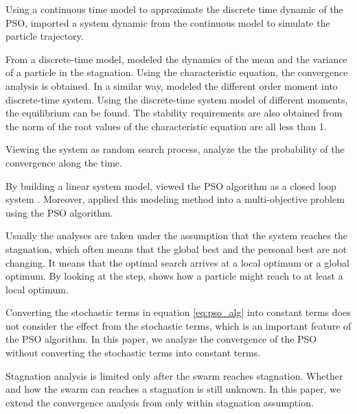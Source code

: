 Using a continuous time model to approximate the discrete time dynamic of the PSO, \cite{5675669} imported a system dynamic from the continuous model to simulate the particle trajectory. 

From a discrete-time model, 
\cite{Jiang20078} 
\cite{jiang2007particle}
modeled the dynamics of the mean and the variance of a particle in the stagnation.
Using the characteristic equation, the convergence analysis is obtained.
In a similar way, 
\cite{5175367}
\cite{Poli:2007:EAS:1276958.1276977}
\cite{Poli:2008:DSS:1384929.1384944}
modeled the different order moment into discrete-time system.
Using the discrete-time system model of different moments, the equilibrium can be found.
The stability requirements are also obtained from the norm of the root values of the characteristic equation are all less than 1.


Viewing the system as random search process, 
\cite{vandenBergh:2010:CPP:2010420.2010421} analyze the the probability of the convergence along the time.

By building a linear system model, \cite{4424687} viewed the PSO algorithm as a closed loop system .
Moreover, \cite{Chakraborty20111411} applied this modeling method into a multi-objective problem using the PSO algorithm. 

Usually the analyses are taken under the assumption that the system reaches the stagnation, which often means that the global best and the personal best are not changing. 
It means that the optimal search arrives at a local optimum or a global optimum.
By looking at the step, \cite{Schmitt:2013:PSO:2463372.2463563} shows how a particle might reach to at least a local optimum.

Converting the stochastic terms in equation \eqref{eq:pso_alg} into constant terms does not consider the effect from the stochastic terms, which is an important feature of the PSO algorithm.
In this paper, we analyze the convergence of the PSO without converting the stochastic terms into constant terms.

Stagnation analysis is limited only after the swarm reaches stagnation.
Whether and how the swarm can reaches a stagnation is still unknown.
In this paper, we extend the convergence analysis from only within stagnation assumption. 